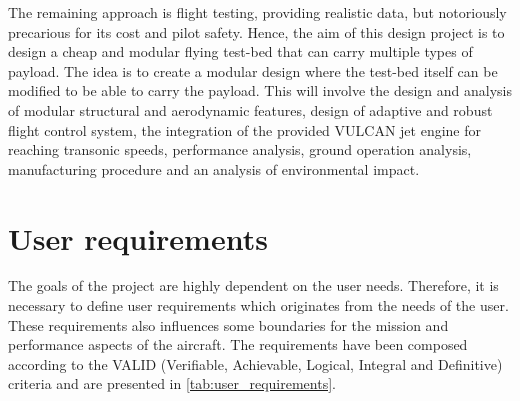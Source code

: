 The remaining approach is flight testing, providing realistic data, but notoriously precarious for its cost and pilot safety. Hence, the aim of this design project is to design a cheap and modular flying test-bed that can carry multiple types of payload. The idea is to create a modular design where the test-bed itself can be modified to be able to carry the payload. This will involve the design and analysis of modular structural and aerodynamic features, design of adaptive and robust flight control system, the integration of the provided VULCAN jet engine for reaching transonic speeds, performance analysis, ground operation analysis, manufacturing procedure and an analysis of environmental impact.




\section{User requirements}
The goals of the project are highly dependent on the user needs. Therefore, it is necessary to define user requirements which originates from the needs of the user. These requirements also influences some boundaries for the mission and performance aspects of the aircraft. The requirements have been composed according to the VALID (Verifiable, Achievable, Logical, Integral and Definitive) criteria and are presented in \autoref{tab:user_requirements}.

